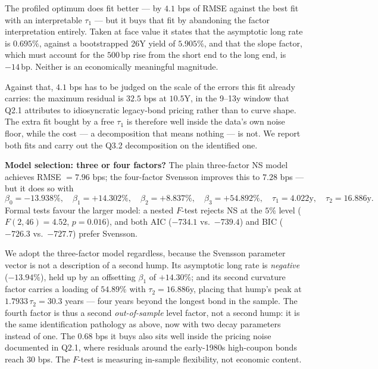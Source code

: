 \documentclass[11pt]{article}
\begin{document}
\noindent The profiled optimum does fit better --- by $4.1$ bps of RMSE against the best fit with an
interpretable $\tau_1$ --- but it buys that fit by abandoning the factor interpretation entirely.
Taken at face value it states that the asymptotic long rate is $0.695\%$, against a bootstrapped
26Y yield of $5.905\%$, and that the slope factor, which must account for the $500\,$bp rise from
the short end to the long end, is $-14\,$bp. Neither is an economically meaningful magnitude.
 
Against that, $4.1$ bps has to be judged on the scale of the errors this fit already carries: the
maximum residual is $32.5$ bps at $10.5$Y, in the 9--13y window that Q2.1 attributes to
idiosyncratic legacy-bond pricing rather than to curve shape. The extra fit bought by a free
$\tau_1$ is therefore well inside the data's own noise floor, while the cost --- a decomposition
that means nothing --- is not. We report both fits and carry out the Q3.2 decomposition on the
identified one.
 
\textbf{Model selection: three or four factors?} The plain three-factor NS model achieves
RMSE $=7.96$ bps; the four-factor Svensson improves this to $7.28$ bps
--- but it does so with
\[
  \beta_0=-13.938\%,\quad \beta_1=+14.302\%,\quad \beta_2=+8.837\%,\quad
  \beta_3=+54.892\%,\quad \tau_1=4.022\text{y},\quad \tau_2=16.886\text{y}.
\]
Formal tests favour the larger model: a nested $F$-test rejects NS at the $5\%$ level
($F(2,46)=4.52$, $p=0.016$), and both AIC ($-734.1$ vs.\ $-739.4$) and BIC ($-726.3$ vs.\ $-727.7$)
prefer Svensson.
 
We adopt the three-factor model regardless, because the Svensson parameter vector is not a
description of a second hump. Its asymptotic long rate is \emph{negative} ($-13.94\%$), held up by
an offsetting $\beta_1$ of $+14.30\%$; and its second curvature factor carries a loading of
$54.89\%$ with $\tau_2=16.886$y, placing that hump's peak at $1.7933\,\tau_2=30.3$ years --- four
years beyond the longest bond in the sample. The fourth factor is thus a second \emph{out-of-sample}
level factor, not a second hump: it is the same identification pathology as above, now with two
decay parameters instead of one. The $0.68$ bps it buys also sits well inside the pricing noise
documented in Q2.1, where residuals around the early-1980s high-coupon bonds reach $30$ bps. The
$F$-test is measuring in-sample flexibility, not economic content.
 
\end{document}
